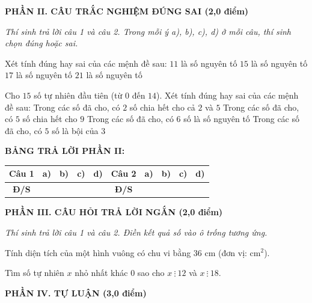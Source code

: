 \documentclass[12pt,a4paper]{article}
\begin{document}
\setcounter{ex}{0}
\noindent\textbf{\large PHẦN II. CÂU TRẮC NGHIỆM ĐÚNG SAI (2,0 điểm)}

\textit{Thí sinh trả lời câu 1 và câu 2. Trong mỗi ý a), b), c), d) ở mỗi câu, thí sinh chọn đúng hoặc sai.}

\vspace{1mm}
\begin{ex}
Xét tính đúng hay sai của các mệnh đề sau:
\choiceTF
{\True $11$ là số nguyên tố}
{$15$ là số nguyên tố}
{\True $17$ là số nguyên tố}
{$21$ là số nguyên tố}
\end{ex}

\begin{ex}
Cho $15$ số tự nhiên đầu tiên (từ $0$ đến $14$). Xét tính đúng hay sai của các mệnh đề sau:
\choiceTF
{\True Trong các số đã cho, có $2$ số chia hết cho cả $2$ và $5$}
{Trong các số đã cho, có $5$ số chia hết cho $9$}
{\True Trong các số đã cho, có $6$ số là số nguyên tố}
{\True Trong các số đã cho, có $5$ số là bội của $3$}
\end{ex}


\noindent\textbf{BẢNG TRẢ LỜI PHẦN II:}
\begin{center}
\begin{tabular}{|c|c|c|c|c||c|c|c|c|c|}
\hline
\textbf{Câu 1} & \textbf{a)} & \textbf{b)} & \textbf{c)} & \textbf{d)} & \textbf{Câu 2} & \textbf{a)} & \textbf{b)} & \textbf{c)} & \textbf{d)} \\
\hline
\textbf{Đ/S} & \rule{0pt}{0.6cm} & & & & \textbf{Đ/S} & & & & \\
\hline
\end{tabular}
\end{center}
\vspace{2mm}

\setcounter{ex}{0}
\noindent\textbf{\large PHẦN III. CÂU HỎI TRẢ LỜI NGẮN (2,0 điểm)}

\textit{Thí sinh trả lời câu 1 và câu 2. Điền kết quả số vào ô trống tương ứng.}

\vspace{1mm}
\begin{ex}
Tính diện tích của một hình vuông có chu vi bằng $36\text{ cm}$ (đơn vị: $\text{cm}^2$). 
\end{ex}

\begin{ex}
Tìm số tự nhiên $x$ nhỏ nhất khác $0$ sao cho $x \ \vdots \ 12$ và $x \ \vdots \ 18$. 
\end{ex}


\setcounter{ex}{0}
\noindent\textbf{\large PHẦN IV. TỰ LUẬN (3,0 điểm)}
\end{document}
